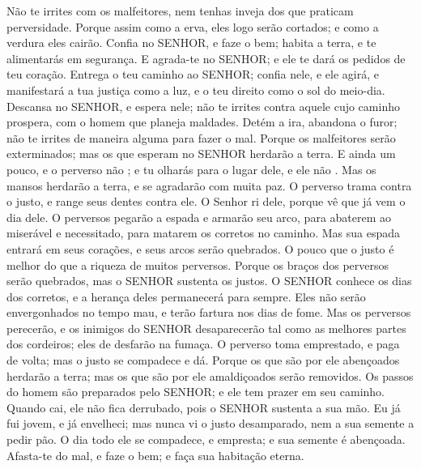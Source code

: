 {\PP 
  Não te irrites com os malfeitores, nem tenhas inveja dos que praticam perversidade.
  Porque assim como a erva, eles logo serão cortados; e como a verdura eles cairão.
  Confia no SENHOR, e faze o bem; habita a terra, e te alimentarás em segurança.
  E agrada-te no SENHOR; e ele te dará os pedidos de teu coração.
  Entrega o teu caminho ao SENHOR; confia nele, e ele agirá,
  e manifestará a tua justiça como a luz, e o teu direito como o sol do meio-dia.
  Descansa no SENHOR, e espera nele; não te irrites contra aquele cujo caminho prospera,
{} com o homem que planeja maldades.
  Detém a ira, abandona o furor; não te irrites de maneira alguma para fazer o mal.
  Porque os malfeitores serão exterminados; mas os que esperam no SENHOR herdarão a terra.
  E ainda um pouco, e o perverso não
{} ; e tu olharás para o lugar dele, e ele não
{} .
  Mas os mansos herdarão a terra, e se agradarão com muita paz.
  O perverso trama contra o justo, e range seus dentes contra ele.
  O Senhor ri dele, porque vê que já vem o dia dele.
  O perversos pegarão a espada e armarão seu arco, para abaterem ao miserável e necessitado, para matarem os corretos no caminho.
  Mas sua espada entrará em seus corações, e seus arcos serão quebrados.
  O pouco que o justo
{} é melhor do que a riqueza de muitos perversos.
  Porque os braços dos perversos serão quebrados, mas o SENHOR sustenta os justos.
  O SENHOR conhece os dias dos corretos, e a herança deles permanecerá para sempre.
  Eles não serão envergonhados no tempo mau, e terão fartura nos dias de fome.
  Mas os perversos perecerão, e os inimigos do SENHOR desaparecerão tal como as melhores partes dos cordeiros; eles de desfarão na fumaça.
  O perverso toma emprestado, e paga de volta; mas o justo se compadece e dá.
  Porque os que são por ele abençoados herdarão a terra; mas os que são por ele amaldiçoados serão removidos.
  Os passos do homem
{} são preparados pelo SENHOR; e ele tem prazer em seu caminho.
  Quando cai, ele não fica derrubado, pois o SENHOR sustenta a sua mão.
  Eu já fui jovem, e já envelheci; mas nunca vi o justo desamparado, nem a sua semente a pedir pão.
  O dia todo ele se compadece, e empresta; e sua semente é abençoada.
  Afasta-te do mal, e faze o bem; e faça sua habitação eterna.
}
